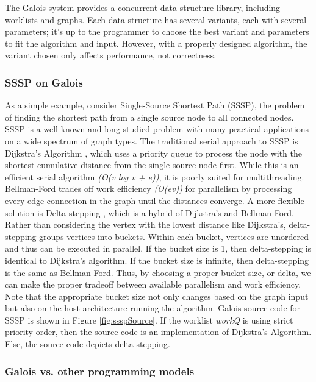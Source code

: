 The Galois system provides a concurrent data structure library, including worklists and graphs. Each data structure 
has several variants, each with several parameters; it's up to the programmer to choose the best variant and 
parameters to fit the algorithm and input. However, with a properly designed algorithm, the variant chosen only 
affects performance, not correctness.

\subsubsection{SSSP on Galois}

As a simple example, consider Single-Source Shortest Path (SSSP), the problem of finding the shortest path from a 
single source node to all connected nodes. SSSP is a well-known and long-studied problem with many practical 
applications on a wide spectrum of graph types. The traditional serial approach to SSSP is Dijkstra's Algorithm 
\cite{dijkstra}, which uses a priority queue to process the node with the shortest cumulative distance from the 
single source node first. While this is an efficient serial algorithm \textit{(O(v log v + e))}, it is poorly 
suited for multithreading. Bellman-Ford \cite{bellmanford} trades off work efficiency \textit{(O(ev))} for 
parallelism by processing every edge connection in the graph until the distances converge. A more flexible 
solution is Delta-stepping \cite{deltaStepping}, which is a hybrid of Dijkstra's and Bellman-Ford. Rather than 
considering the vertex with the lowest distance like Dijkstra's, delta-stepping groups vertices into buckets. Within 
each bucket, vertices are unordered and thus can be executed in parallel. If the bucket size is 1, then 
delta-stepping is identical to Dijkstra's algorithm. If the bucket size is infinite, then delta-stepping is the same 
as Bellman-Ford. Thus, by choosing a proper bucket size, or delta, we can make the proper tradeoff between 
available parallelism and work efficiency. Note that the appropriate bucket size not only changes based on the graph 
input but also on the host architecture running the algorithm. Galois source code for SSSP is shown in Figure 
\ref{fig:ssspSource}. If the worklist \textit{workQ} is using strict priority order, then the source code is an 
implementation of Dijkstra's Algorithm. Else, the source code depicts delta-stepping.

\subsubsection{Galois vs. other programming models}

